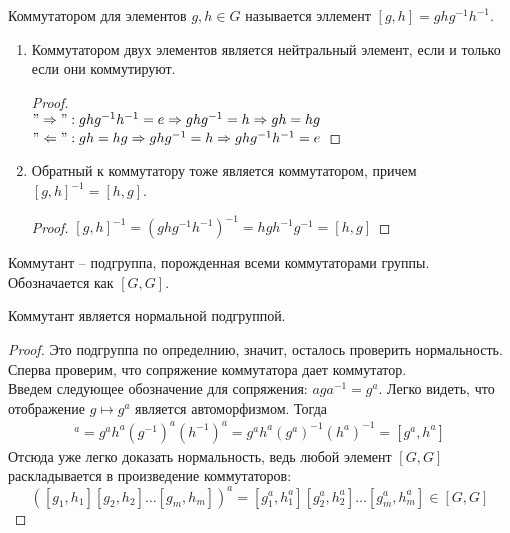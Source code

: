 \begin{conj}
    Коммутатором для элементов $g, h \in G$ называется эллемент $[g, h] = ghg^{-1}h^{-1}$.
\end{conj}
\begin{notice}
    \begin{enumerate}
        \item Коммутатором двух элементов является нейтральный элемент, если и только если они коммутируют.
        \begin{proof} \quad \\
            $"\Rightarrow": ghg^{-1}h^{-1} = e \Rightarrow ghg^{-1} = h \Rightarrow gh = hg$ \\
            $"\Leftarrow": gh = hg \Rightarrow ghg^{-1} = h \Rightarrow ghg^{-1}h^{-1} = e$
        \end{proof}
        \item Обратный к коммутатору тоже является коммутатором, причем $[g, h]^{-1} = [h, g]$.
        \begin{proof}
            $[g, h]^{-1} = (ghg^{-1}h^{-1})^{-1} = hgh^{-1}g^{-1} = [h, g]$
        \end{proof}
    \end{enumerate}
    
\end{notice}


\begin{conj}
    Коммутант -- подгруппа, порожденная всеми коммутаторами группы. Обозначается как $[G, G]$.
\end{conj}

\begin{theorem-non}
    Коммутант является нормальной подгруппой.
\end{theorem-non}
\begin{proof}
    Это подгруппа по определнию, значит, осталось проверить нормальность.
    Сперва проверим, что сопряжение коммутатора дает коммутатор. \\
    Введем следующее обозначение для сопряжения: $aga^{-1} = g^a$.
    Легко видеть, что отображение $g \mapsto g^a$ является автоморфизмом.
    Тогда
    \begin{gather*}
        [g, h]^a = g^ah^a(g^{-1})^a(h^{-1})^a = g^ah^a(g^a)^{-1}(h^a)^{-1} = [g^a, h^a]
    \end{gather*}
    Отсюда уже легко доказать нормальность, ведь любой элемент $[G, G]$ раскладывается в произведение коммутаторов:
    \[ ([g_1, h_1][g_2, h_2]\dots[g_m, h_m])^a = [g_1^a, h_1^a][g_2^a, h_2^a]\dots[g_m^a, h_m^a] \in [G, G] \]
\end{proof}

